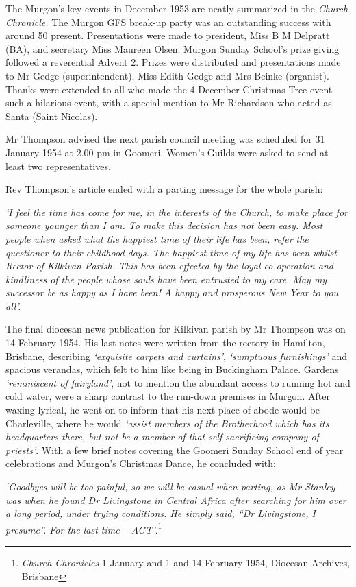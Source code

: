 The Murgon's key events in December 1953 are neatly summarized in the \emph{Church Chronicle.} The Murgon GFS break-up party was an outstanding success with around 50 present. Presentations were made to president, Miss B M Delpratt (BA), and secretary Miss Maureen Olsen. Murgon Sunday School's prize giving followed a reverential Advent 2. Prizes were distributed and presentations made to Mr Gedge (superintendent), Miss Edith Gedge and Mrs Beinke (organist). Thanks were extended to all who made the 4 December Christmas Tree event such a hilarious event, with a special mention to Mr Richardson who acted as Santa (Saint Nicolas).

Mr Thompson advised the next parish council meeting was scheduled for 31 January 1954 at 2.00 pm in Goomeri. Women's Guilds were asked to send at least two representatives.

Rev Thompson's article ended with a parting message for the whole parish:

\emph{`I feel the time has come for me, in the interests of the Church, to make place for someone younger than I am. To make this decision has not been easy. Most people when asked what the happiest time of their life has been, refer the questioner to their childhood days. The happiest time of my life has been whilst Rector of Kilkivan Parish. This has been effected by the loyal co-operation and kindliness of the people whose souls have been entrusted to my care. May my successor be as happy as I have been! A happy and prosperous New Year to you all'.}

The final diocesan news publication for Kilkivan parish by Mr Thompson was on 14 February 1954. His last notes were written from the rectory in Hamilton, Brisbane, describing \emph{`exquisite carpets and curtains'}, \emph{`sumptuous furnishings'} and spacious verandas, which felt to him like being in Buckingham Palace. Gardens \emph{`reminiscent of fairyland'}, not to mention the abundant access to running hot and cold water, were a sharp contrast to the run-down premises in Murgon. After waxing lyrical, he went on to inform that his next place of abode would be Charleville, where he would \emph{`assist members of the Brotherhood which has its headquarters there, but not be a member of that self-sacrificing company of priests'}. With a few brief notes covering the Goomeri Sunday School end of year celebrations and Murgon's Christmas Dance, he concluded with:

\emph{`Goodbyes will be too painful, so we will be casual when parting, as Mr Stanley was when he found Dr Livingstone in Central Africa after searching for him over a long period, under trying conditions. He simply said, ``Dr Livingstone, I presume''. For the last time -- AGT'}.\footnote{\emph{Church Chronicles} 1 January and 1 and 14 February 1954, Diocesan Archives, Brisbane}

